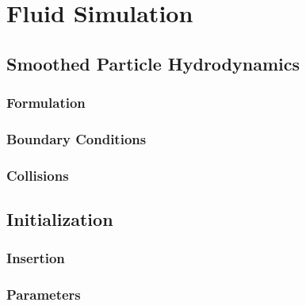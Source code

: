 \chapter{Fluid Simulation}

\section{Smoothed Particle Hydrodynamics}
\subsection{Formulation}
\subsection{Boundary Conditions}
\subsection{Collisions}


\section{Initialization}
\subsection{Insertion}
\subsection{Parameters}

